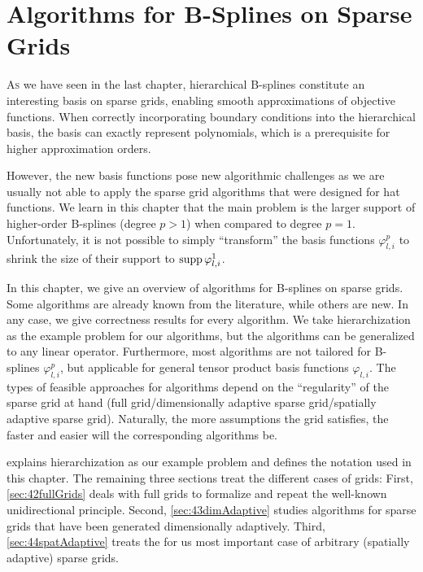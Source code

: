 
\chapter{Algorithms for B-Splines on Sparse Grids}



\lettrine{A}{s} we have seen in the last chapter,
hierarchical B-splines constitute an interesting basis on sparse grids,
enabling smooth approximations of objective functions.
When correctly incorporating boundary conditions into the hierarchical basis,
the basis can exactly represent polynomials,
which is a prerequisite for higher approximation orders.

However, the new basis functions pose new algorithmic challenges
as we are usually not able to apply the sparse grid algorithms
that were designed for hat functions.
We learn in this chapter that the main problem is the larger support
of higher-order B-splines (degree $p > 1$) when compared to degree $p = 1$.
Unfortunately, it is not possible to simply ``transform'' the basis
functions $\varphi_{l,i}^p$ to shrink the size of their support
to $\operatorname{supp} \varphi_{l,i}^1$.

In this chapter, we give an overview of algorithms for B-splines
on sparse grids.
Some algorithms are already known from the literature,
while others are new.
In any case, we give correctness results for every algorithm.
We take hierarchization as the example problem for our algorithms,
but the algorithms can be generalized to any linear operator.
Furthermore, most algorithms are not tailored for B-splines $\varphi_{l,i}^p$,
but applicable for general tensor product basis functions $\varphi_{l,i}$.
The types of feasible approaches for algorithms
depend on the ``regularity'' of the sparse grid at hand
(full grid/dimensionally adaptive sparse grid/spatially adaptive sparse grid).
Naturally, the more assumptions the grid satisfies, the faster and
easier will the corresponding algorithms be.

 explains hierarchization as our example problem
and defines the notation used in this chapter.
The remaining three sections treat the different cases of grids:
First, \cref{sec:42fullGrids} deals with full grids to formalize and repeat
the well-known unidirectional principle.
Second, \cref{sec:43dimAdaptive} studies algorithms for
sparse grids that have been generated dimensionally adaptively.
Third, \cref{sec:44spatAdaptive} treats the for us most important case
of arbitrary (spatially adaptive) sparse grids.

